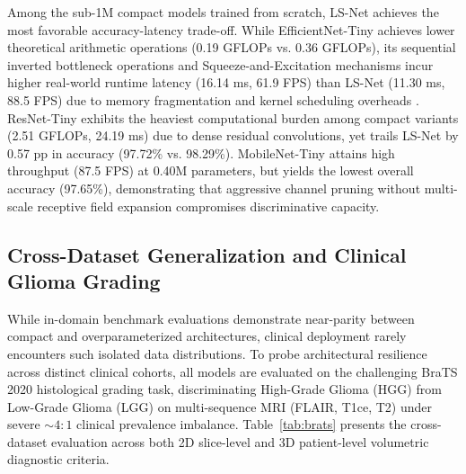 Among the sub-1M compact models trained from scratch, LS-Net achieves the most favorable accuracy-latency trade-off. While EfficientNet-Tiny achieves lower theoretical arithmetic operations (0.19 GFLOPs vs. 0.36 GFLOPs), its sequential inverted bottleneck operations and Squeeze-and-Excitation mechanisms incur higher real-world runtime latency (16.14 ms, 61.9 FPS) than LS-Net (11.30 ms, 88.5 FPS) due to memory fragmentation and kernel scheduling overheads \cite{25}. ResNet-Tiny exhibits the heaviest computational burden among compact variants (2.51 GFLOPs, 24.19 ms) due to dense residual convolutions, yet trails LS-Net by 0.57 pp in accuracy (97.72\% vs. 98.29\%). MobileNet-Tiny attains high throughput (87.5 FPS) at 0.40M parameters, but yields the lowest overall accuracy (97.65\%), demonstrating that aggressive channel pruning without multi-scale receptive field expansion compromises discriminative capacity.

\subsection{Cross-Dataset Generalization and Clinical Glioma Grading}

While in-domain benchmark evaluations demonstrate near-parity between compact and overparameterized architectures, clinical deployment rarely encounters such isolated data distributions. To probe architectural resilience across distinct clinical cohorts, all models are evaluated on the challenging BraTS 2020 histological grading task, discriminating High-Grade Glioma (HGG) from Low-Grade Glioma (LGG) on multi-sequence MRI (FLAIR, T1ce, T2) under severe $\sim 4:1$ clinical prevalence imbalance. Table~\ref{tab:brats} presents the cross-dataset evaluation across both 2D slice-level and 3D patient-level volumetric diagnostic criteria.

